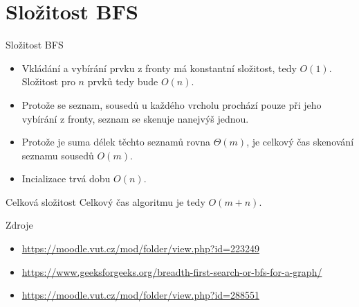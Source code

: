 \documentclass[10pt, czech]{beamer}
\begin{document}
\section{Složitost BFS}
\begin{frame}{Složitost BFS}
    \begin{itemize}
        \item Vkládání a vybírání prvku z fronty má konstantní složitost, tedy $O(1)$. Složitost pro $n$    prvků tedy bude $O(n)$.
        \item Protože se seznam, sousedů u každého vrcholu prochází pouze při jeho vybírání z fronty, seznam se skenuje nanejvýš jednou.
        \item Protože je suma délek těchto seznamů rovna $\Theta (m)$, je celkový čas skenování seznamu sousedů $O(m)$.
        \item Incializace trvá dobu $O(n)$.
    \end{itemize}
    \begin{alertblock}{Celková složitost}
        Celkový čas algoritmu je tedy $O(m+n)$.
    \end{alertblock}
\end{frame}

\begin{frame}{Zdroje}
    \begin{itemize}
        \item \url{https://moodle.vut.cz/mod/folder/view.php?id=223249}
        \item \url{https://www.geeksforgeeks.org/breadth-first-search-or-bfs-for-a-graph/}
        \item \url{https://moodle.vut.cz/mod/folder/view.php?id=288551}
    \end{itemize}
\end{frame}
\end{document}
